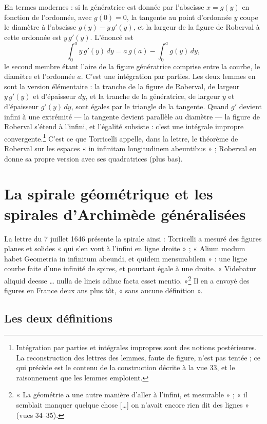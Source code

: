 \documentclass[11pt,a4paper]{article}
\begin{document}
En termes modernes : si la génératrice est donnée par l'abscisse $x=g(y)$ en
fonction de l'ordonnée, avec $g(0)=0$, la tangente au point d'ordonnée $y$ coupe
le diamètre à l'abscisse $g(y)-y\,g'(y)$, et la largeur de la figure de Roberval
à cette ordonnée est $y\,g'(y)$. L'énoncé est
\[
\int_0^a y\,g'(y)\,dy = a\,g(a)-\int_0^a g(y)\,dy ,
\]
le second membre étant l'aire de la figure génératrice comprise entre la courbe,
le diamètre et l'ordonnée $a$. C'est une intégration par parties. Les deux
lemmes en sont la version élémentaire : la tranche de la figure de Roberval,
de largeur $y\,g'(y)$ et d'épaisseur $dy$, et la tranche de la génératrice, de
largeur $y$ et d'épaisseur $g'(y)\,dy$, sont égales par le triangle de la
tangente. Quand $g'$ devient infini à une extrémité — la tangente devient
parallèle au diamètre — la figure de Roberval s'étend à l'infini, et l'égalité
subsiste : c'est une intégrale impropre convergente.\footnote{Intégration par
parties et intégrales impropres sont des notions postérieures. La
reconstruction des lettres des lemmes, faute de figure, n'est pas tentée ; ce
qui précède est le contenu de la construction décrite à la vue 33, et le
raisonnement que les lemmes emploient.} C'est ce que Torricelli appelle, dans la
lettre, le théorème de Roberval sur les espaces « in infinitam longitudinem
abeuntibus » ; Roberval en donne sa propre version avec ses quadratrices (plus
bas).

\section*{La spirale géométrique et les spirales d'Archimède généralisées}

La lettre du 7 juillet 1646 présente la spirale ainsi : Torricelli a mesuré des
figures planes et solides « qui s'en vont à l'infini en ligne droite » ; « Alium
modum habet Geometria in infinitum abeundi, et quidem mensurabilem » : une ligne
courbe faite d'une infinité de spires, et pourtant égale à une droite. « Videbatur
aliquid deesse \ldots{} nulla de lineis adhuc facta esset mentio. »\footnote{« La
géométrie a une autre manière d'aller à l'infini, et mesurable » ; « il semblait
manquer quelque chose [\ldots] on n'avait encore rien dit des lignes » (vues
34--35).} Il en a envoyé des figures en France deux ans plus tôt, « sans aucune
définition ».

\subsection*{Les deux définitions}
\end{document}
